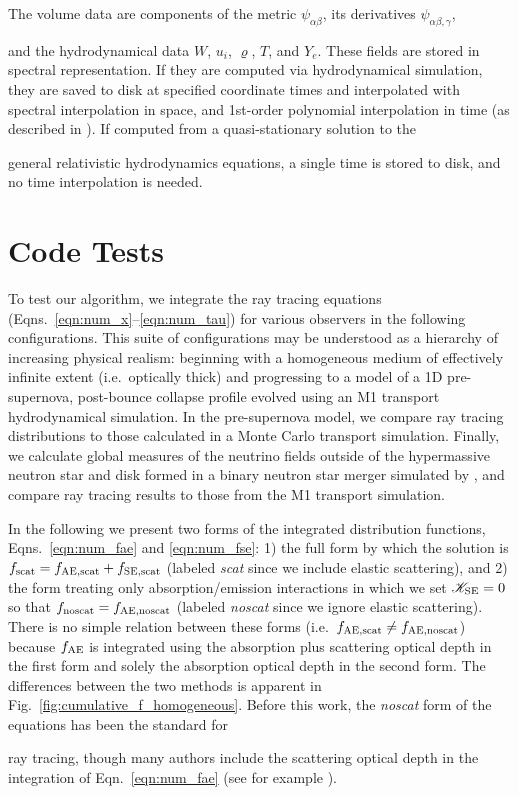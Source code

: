 \documentclass[aps,floatfix,prd,superscriptaddress,twocolumn]{revtex4-1}
\newcommand{\todo}[1]{\marginpar{\tiny{\textcolor{red}{#1}}}}
\renewcommand\todo[1]{} %
\begin{document}
The volume data are components of the metric $\psi_{\alpha\beta}$,
its derivatives $\psi_{\alpha\beta,\gamma}$,
\todo{state num independent components}
and the hydrodynamical data $W$, $u_i$, $\varrho$, $T$, and $Y_e$.
These fields are stored in spectral representation.
If they are computed via hydrodynamical simulation, they are saved to disk
at specified coordinate times and interpolated
with spectral interpolation in space,
and 1st-order polynomial interpolation in time
(as described in \cite[App.~B]{bohn2016-code}).
If computed from a quasi-stationary solution to the
\todo{clarify quasistationary timescale}
general relativistic hydrodynamics equations,
a single time is stored to disk, and no time interpolation is needed.

\section{Code Tests}
\label{sec:tests}

To test our algorithm, we integrate the ray tracing equations
(Eqns.~\ref{eqn:num_x}--\ref{eqn:num_tau}) for various observers
in the following configurations. This suite of configurations
may be understood as a hierarchy of increasing physical realism:
beginning with a homogeneous medium of effectively
infinite extent (i.e.\ optically thick) and progressing to a model of a
1D pre-supernova, post-bounce collapse profile
evolved using an M1 transport hydrodynamical simulation.
In the pre-supernova model, we compare ray tracing distributions
to those calculated in a Monte Carlo transport simulation.
Finally, we calculate global measures of the neutrino fields outside of the
hypermassive neutron star and disk formed in a binary neutron star
merger simulated by \cite{fouc2016-m1_nsns, fouc2016-m1_evolve_n},
and compare ray tracing results to those from the M1 transport simulation.

In the following we present two forms of the integrated distribution functions,
Eqns.~\ref{eqn:num_fae} and \ref{eqn:num_fse}:
1) the full form  by which the solution is $f_{\rm scat}=f_{\rm AE,scat}+f_{\rm SE,scat}$
(labeled \emph{scat} since we include elastic scattering), and
2) the form treating only absorption/emission interactions
in which we set $\mathscr{K}_{\rm SE}=0$ so that $f_{\rm noscat}=f_{\rm AE,noscat}$
(labeled \emph{noscat} since we ignore elastic scattering).
There is no simple relation between these forms
(i.e.\ $f_{\rm AE,scat} \neq f_{\rm AE,noscat}$)
because $f_{\rm AE}$ is integrated using the absorption plus scattering optical depth
in the first form and solely the absorption optical depth in the second form.
The differences between the two methods is apparent
in Fig.~\ref{fig:cumulative_f_homogeneous}.
Before this work, the \emph{noscat} form of the equations has been the standard for
\todo{explain why; cite others}
ray tracing, though many authors include the scattering optical depth in
the integration of Eqn.~\ref{eqn:num_fae}
(see for example \cite{hari2010-gr_nunubar_collapsar}).
\end{document}
